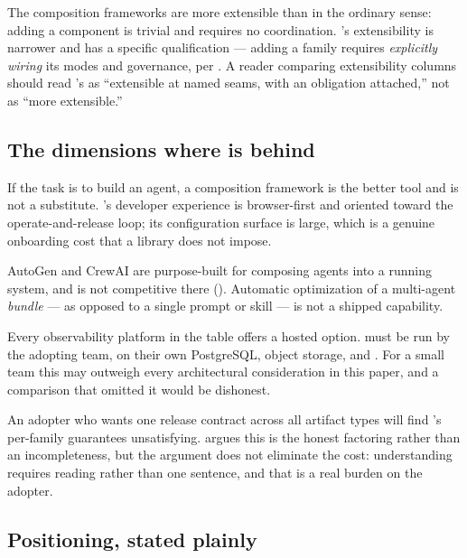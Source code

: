 The composition frameworks are
more extensible than \sys in the ordinary sense: adding a component is trivial and
requires no coordination. \sys's extensibility is narrower and has a specific
qualification --- adding a family requires \emph{explicitly wiring} its modes and
governance, per . A reader comparing extensibility columns
should read \sys's as ``extensible at named seams, with an obligation attached,''
not as ``more extensible.''

\subsection{The dimensions where \sys is behind}

 If the task is to build an agent, a
composition framework is the better tool and \sys is not a substitute. \sys's
developer experience is browser-first and oriented toward the operate-and-release
loop; its configuration surface is large, which is a genuine onboarding cost that a
library does not impose.

 AutoGen and CrewAI are purpose-built for
composing agents into a running system, and \sys is not competitive there
(). Automatic optimization of a multi-agent \emph{bundle} ---
as opposed to a single prompt or skill --- is not a shipped \sys capability.

 Every observability platform in the table offers a hosted
option. \sys must be run by the adopting team, on their own PostgreSQL, object
storage, and \mlflow{}. For a small team this may outweigh every architectural
consideration in this paper, and a comparison that omitted it would be dishonest.

 An adopter who wants one release contract across all artifact
types will find \sys's per-family guarantees unsatisfying. 
argues this is the honest factoring rather than an incompleteness, but the argument
does not eliminate the cost: understanding \sys requires reading
 rather than one sentence, and that is a real burden on the
adopter.

\subsection{Positioning, stated plainly}

